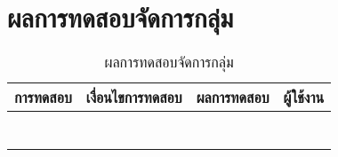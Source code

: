 \section{ผลการทดสอบจัดการกลุ่ม}
\begin{table}[H]
	\caption{ผลการทดสอบจัดการกลุ่ม}
    \centering	
	\label{tab:test27}
    \begin{tabular}{ | p{4cm} | p{4cm} | p{4cm} | p{2cm} | }
		\hline
	\multicolumn{1}{|c|}{การทดสอบ} & \multicolumn{1}{c|}{เงื่อนไขการทดสอบ} & \multicolumn{1}{c|}{ผลการทดสอบ} & \multicolumn{1}{c|}{ผู้ใช้งาน}                             \\ \hline
	\setstretch{1.0}{ทดสอบจัดการกลุ่ม}
	& \setstretch{1.0}{เจ้าของกลุ่มคลิกเลือกเพิ่มสมาชิกกลุ่ม}
	& \setstretch{1.0}{ระบบจะเพิ่มสมาชิกเข้ามาในกลุ่ม} 
	&\setstretch{1.0}{\begin{flushleft}ผู้ใช้งาน\end{flushleft}} \\ \cline{2-3} 
	& \setstretch{1.0}{เจ้าของกลุ่มเลือกลบสมาชิกกลุ่ม}
	& \setstretch{1.0}{ระบบจะลบสมาชิกเข้ามาในกลุ่ม } 
	&\setstretch{1.0}{}\\ \cline{2-3} 
	& \setstretch{1.0}{เจ้าของกลุ่มเลือกข้อมูลกลุ่ม}
	& \setstretch{1.0}{ระบบจะแสดงแยกระหว่างเจ้าของกลุ่ม และสมาชิกในกลุ่ม } 
	&\setstretch{1.0}{}\\ \cline{2-3} 
	& \setstretch{1.0}{เจ้าของกลุ่มเลือกลบกลุ่ม}
	& \setstretch{1.0}{ระบบลบสมาชิกทุกคนในกลุ่ม และลบกลุ่ม จากนั้นจะกลับไปหน้าแสดงกลุ่ม } 
	&\setstretch{1.0}{}\\ \cline{2-3} 
	& \setstretch{1.0}{สมาชิกในกลุ่มเลือกออกจากกลุ่ม}
	& \setstretch{1.0}{ระบบจะลบสมาชิกออกจากกลุ่ม } 
	&\setstretch{1.0}{}\\ \cline{2-3} 
	& \setstretch{1.0}{ผู้ใช้กรอกข้อความและกดส่งข้อความ}
	& \setstretch{1.0}{ระบบจะบันทึกข้อความและแสดงข้อความ } 
	&\setstretch{1.0}{}\\ \cline{2-3} 
	& \setstretch{1.0}{ผู้ใช้ไม่กรอกข้อความและกดส่งข้อความ}
	& \setstretch{1.0}{ระบบจะไม่บันทึกข้อความ และไม่แสดงข้อความ } 
	&\setstretch{1.0}{}\\ \cline{2-3} \hline
    \end{tabular}
\end{table}

